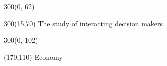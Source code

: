 {
  \begin{frame}
    \begin{textblock}{300}(0, 62)
    \end{textblock}
    \begin{textblock}{300}(15,70)
      The study of interacting decision makers
    \end{textblock}
   \end{frame}
}
{
  \begin{frame}
    \begin{textblock}{300}(0, 102)
    \end{textblock}
    \begin{textblock}{30}(170,110)
      Economy
    \end{textblock}
  \end{frame}
}

